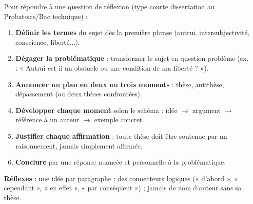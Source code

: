 \documentclass[11pt]{article}
\begin{document}
\begin{methode}
Pour répondre à une question de réflexion (type courte dissertation au Probatoire/Bac technique) :
\begin{enumerate}
\item \textbf{Définir les termes} du sujet dès la première phrase (autrui, intersubjectivité, conscience, liberté...).
\item \textbf{Dégager la problématique} : transformer le sujet en question problème (ex. : « Autrui est-il un obstacle ou une condition de ma liberté ? »).
\item \textbf{Annoncer un plan en deux ou trois moments} : thèse, antithèse, dépassement (ou deux thèses confrontées).
\item \textbf{Développer chaque moment} selon le schéma : idée $\rightarrow$ argument $\rightarrow$ référence à un auteur $\rightarrow$ exemple concret.
\item \textbf{Justifier chaque affirmation} : toute thèse doit être soutenue par un raisonnement, jamais simplement affirmée.
\item \textbf{Conclure} par une réponse nuancée et personnelle à la problématique.
\end{enumerate}
\textbf{Réflexes} : une idée par paragraphe ; des connecteurs logiques (« d'abord », « cependant », « en effet », « par conséquent ») ; jamais de nom d'auteur sans sa thèse.
\end{methode}
\end{document}
